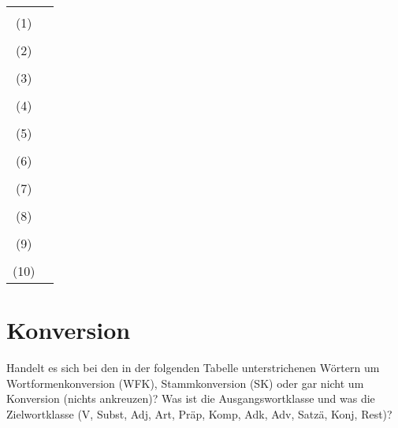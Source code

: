 \begin{center}
  \begin{tabular}[h]{cp{}}
    &\\
    (1) & \\\cline{2-2}
    &\\
    (2) & \\\cline{2-2}
    &\\
    (3) & \\\cline{2-2}
    &\\
    (4) & \\\cline{2-2}
    &\\
    (5) & \\\cline{2-2}
    &\\
    (6) & \\\cline{2-2}
    &\\
    (7) & \\\cline{2-2}
    &\\
    (8) & \\\cline{2-2}
    &\\
    (9) & \\\cline{2-2}
    &\\
    (10) & \\\cline{2-2}
  \end{tabular}
\end{center}


\section{Konversion}


Handelt es sich bei den in der folgenden Tabelle unterstrichenen Wörtern um Wortformenkonversion (WFK), Stammkonversion (SK) oder gar nicht um Konversion (nichts ankreuzen)?
Was ist die Ausgangswortklasse und was die Zielwortklasse (V, Subst, Adj, Art, Präp, Komp, Adk, Adv, Satzä, Konj, Rest)?

